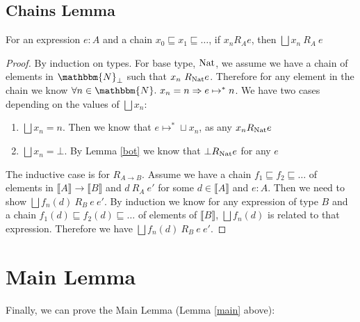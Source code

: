 \subsection{Chains Lemma}

\vspace{0.25cm}

\begin{lem}\label{chain}
For an expression $e : A$ and a  chain $x_0 \sqsubseteq x_1 \sqsubseteq \dots$, if $x_n R_A e$, then $\bigsqcup x_n \ R_A \ e$
\end{lem}

\begin{proof}
By induction on types. For base type, $\operatorname{Nat}$, we assume we have a chain of elements in $\mathbbm{N}_\bot$ such that $x_n \ R_{\operatorname{Nat}} e$. Therefore for any element in the chain we know $\forall n \in \mathbbm{N} . \ x_n = n \Rightarrow e \mapsto^* n$. We have two cases depending on the values of $\bigsqcup x_n$:

\begin{enumerate}
\item{$\bigsqcup x_n = n$. Then we know that $e \mapsto^* \sqcup x_n$, as any $x_n R_{\operatorname{Nat}} e$}
\item{$\bigsqcup x_n = \bot$. By Lemma \ref{bot} we know that $\bot R_{\operatorname{Nat}} e$ for any $e$}
\end{enumerate}

The inductive case is for $R_{A \to B}$. Assume we have a chain $f_1 \sqsubseteq f_2 \sqsubseteq \dots$ of elements in $\llbracket A \rrbracket \to \llbracket B \rrbracket$ and $d \ R_A \ e'$ for some $d \in \llbracket A \rrbracket$ and $e : A$. Then we need to show $\bigsqcup f_n (d) \ R_B \ e \ e'$. By induction we know for any expression of type $B$ and a chain  $f_1(d) \sqsubseteq f_2(d) \sqsubseteq \dots$ of elements of $\llbracket B \rrbracket$, $\bigsqcup f_n(d)$ is related to that expression. Therefore we have $\bigsqcup f_n(d) \ R_B \ e \ e'$.
\end{proof}

\section{Main Lemma}
Finally, we can prove the Main Lemma (Lemma \ref{main} above):




